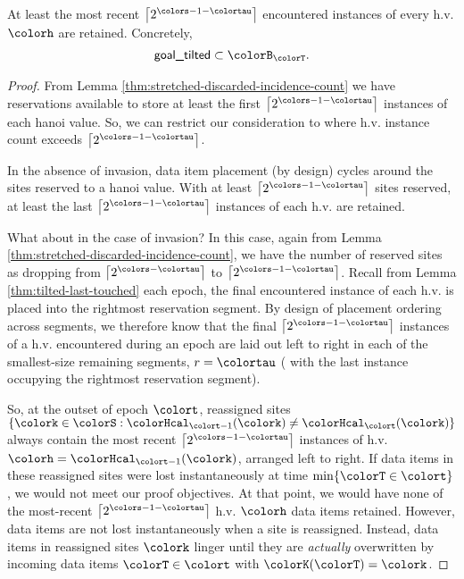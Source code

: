 \begin{lemma}
\label{thm:tilted-most-recent-retained}
At least the most recent $\left\lceil2^{\colors - 1 - \colortau}\right\rceil$ encountered instances of every h.v. $\colorh$ are retained.
Concretely,
\begin{align*}
\textsf{goal\_tilted} \subset \colorB_{\colorT}.
\end{align*}
\end{lemma}
\begin{proof}
From Lemma \ref{thm:stretched-discarded-incidence-count} we have reservations available to store at least the first $\left\lceil 2^{\colors - 1 - \colortau} \right\rceil$ instances of each hanoi value.
So, we can restrict our consideration to where h.v. instance count exceeds $\left\lceil 2^{\colors - 1 - \colortau} \right\rceil$.

In the absence of invasion, data item placement (by design) cycles around the sites reserved to a hanoi value.
With at least $\left\lceil 2^{\colors - 1 - \colortau} \right\rceil$ sites reserved, at least the last $\left\lceil 2^{\colors - 1 - \colortau} \right\rceil$ instances of each h.v. are retained.

What about in the case of invasion?
In this case, again from Lemma \ref{thm:stretched-discarded-incidence-count}, we have the number of reserved sites as dropping from $\left\lceil 2^{\colors - \colortau} \right\rceil$ to $\left\lceil 2^{\colors - 1 - \colortau} \right\rceil$.
Recall from Lemma \ref{thm:tilted-last-touched} each epoch, the final encountered instance of each h.v. is placed into the rightmost reservation segment.
By design of placement ordering across segments, we therefore know that the final $\left\lceil 2^{\colors - 1 - \colortau} \right\rceil$ instances of a h.v. encountered during an epoch are laid out left to right in each of the smallest-size remaining segments, $r = \colortau$ ( with the last instance occupying the rightmost reservation segment).

So, at the outset of epoch $\colort$, reassigned sites $\{\colork \in \colorS : \colorHcal_{\colort - 1}(\colork) \neq \colorHcal_{\colort}(\colork)\}$ always contain the most recent $\left\lceil 2^{\colors - 1 - \colortau} \right\rceil$ instances of h.v. $\colorh = \colorHcal_{\colort - 1}(\colork)$, arranged left to right.
If data items in these reassigned sites were lost instantaneously at time $\min\{\colorT \in \colort\}$, we would not meet our proof objectives.
At that point, we would have none of the most-recent $\left\lceil 2^{\colors - 1 - \colortau} \right\rceil$ h.v. $\colorh$ data items retained.
However, data items are not lost instantaneously when a site is reassigned.
Instead, data items in reassigned sites $\colork$ linger until they are \textit{actually} overwritten by incoming data items $\colorT \in \colort$ with $\colorK(\colorT) = \colork$.


\end{proof}
